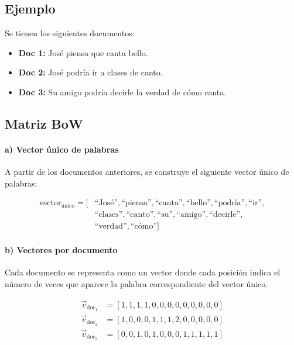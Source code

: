 \documentclass[12pt]{article}
\begin{document}
\subsection*{Ejemplo}

Se tienen los siguientes documentos:

\begin{itemize}
    \item \textbf{Doc 1:} José piensa que canta bello.
    \item \textbf{Doc 2:} José podría ir a clases de canto.
    \item \textbf{Doc 3:} Su amigo podría decirle la verdad de cómo canta.
\end{itemize}

\subsection*{Matriz BoW}

\paragraph{a) Vector único de palabras}

A partir de los documentos anteriores, se construye el siguiente vector único de palabras:

\begin{equation}
\begin{aligned}
\text{vector}_{\text{único}} = [&\text{``José''}, \text{``piensa''}, \text{``canta''}, \text{``bello''}, \text{``podría''}, \text{``ir''}, \\
&\text{``clases''}, \text{``canto''}, \text{``su''}, \text{``amigo''}, \text{``decirle''}, \\
&\text{``verdad''}, \text{``cómo''}]
\end{aligned}
\end{equation}

\paragraph{b) Vectores por documento}

Cada documento se representa como un vector donde cada posición indica el número de veces que aparece la palabra correspondiente del vector único.

\begin{align}
\vec{v}_{\text{doc}_1} &= [1, 1, 1, 1, 0, 0, 0, 0, 0, 0, 0, 0, 0] \\
\vec{v}_{\text{doc}_2} &= [1, 0, 0, 0, 1, 1, 1, 2, 0, 0, 0, 0, 0] \\
\vec{v}_{\text{doc}_3} &= [0, 0, 1, 0, 1, 0, 0, 0, 1, 1, 1, 1, 1]
\end{align}
\end{document}
